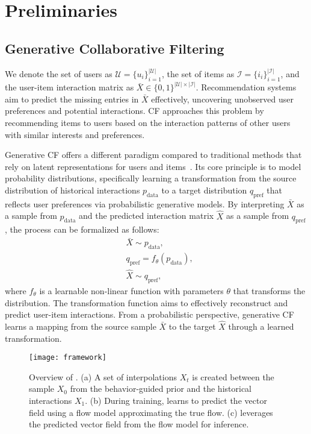 \documentclass[sigconf]{acmart}
\begin{document}
\section{Preliminaries}

\subsection{Generative Collaborative Filtering}
We denote the set of users as $\mathcal{U}=\{u_i\}_{i=1}^{|\mathcal{U}|}$, the set of items as $\mathcal{I}=\{i_i\}_{i=1}^{|\mathcal{I}|}$, and the user-item interaction matrix as $\bar X \in \{0, 1\}^{|\mathcal{U}| \times |\mathcal{I}|}$. Recommendation systems aim to predict the missing entries in $\bar X$ effectively, uncovering unobserved user preferences and potential interactions. CF approaches this problem by recommending items to users based on the interaction patterns of other users with similar interests and preferences.

Generative CF offers a different paradigm compared to traditional methods that rely on latent representations for users and items~\cite{rendle2012bpr, he2017neural, he2020lightgcn}. Its core principle is to model probability distributions,
specifically learning a transformation from the source distribution of historical interactions $p_{\text{data}}$ to a target distribution $q_{\text{pref}}$ that reflects user preferences via probabilistic generative models. By interpreting $\bar X$ as a sample from $p_{\text{data}}$ and the predicted interaction matrix $\hat X$ as a sample from $q_{\text{pref}}$, the process can be formalized as follows:
\begin{equation}
    \begin{aligned}
        &\bar X \sim p_{\text{data}}, \\
        &q_{\text{pref}} = f_\theta(p_{\text{data}}),  \\
        &\hat X \sim q_{\text{pref}},
    \end{aligned}
\end{equation}
where $f_\theta$ is a learnable non-linear function with parameters $\theta$ that transforms the distribution. The transformation function aims to effectively reconstruct and predict user-item interactions. From a probabilistic perspective, generative CF learns a mapping from the source sample $\bar X$ to the target $\hat X$ through a learned transformation.

\begin{figure*}[ht]
    \centering
    \texttt{[image: framework]}
    \caption{Overview of \ours. (a) A set of interpolations $X_t$ is created between the sample $X_0$ from the behavior-guided prior and the historical interactions $X_1$. (b) During training, \ours learns to predict the vector field using a flow model approximating the true flow. (c) \ours leverages the predicted vector field from the flow model for inference.}
    \label{fig:framework}
\end{figure*}
\end{document}
